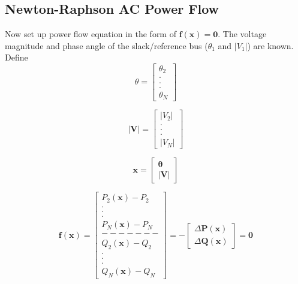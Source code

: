 \documentclass[12pt]{article}
\begin{document}
\subsection*{Newton-Raphson AC Power Flow}

Now set up power flow equation in the form of $\mathbf{f}\left (\mathbf{x} \right )=\mathbf{0}$.
The voltage magnitude and phase angle of the slack/reference bus ($\theta_{1}$
and $|V_{1}|$) are known.
\space
\space
Define
\begin{equation}
\theta =\left [ \begin{array}{c} \theta{_2}\\.\\.\\.\\ \theta_{N} \end{array} \right]
\end{equation}

\begin{equation}
|\mathbf{V}| =\left [ \begin{array}{c} |V_{2}| \\.\\.\\.\\|V_{N}| \end{array} \right]
\end{equation}

\begin{equation}
\mathbf{x}  =\left [ \begin{array}{c} \boldsymbol{\theta}\\|\mathbf{V}| \end{array} \right]
\end{equation}


\begin{equation}
\mathbf{f}\left (\mathbf{x} \right ) = \left [ \begin{array}{c} P_{2}\left (
\mathbf{x} \right ) - P_{2} \\.\\.\\.\\ P_{N}\left ( \mathbf{x} \right ) - P_{N}
\\-------\\Q_{2}\left ( \mathbf{x} \right ) - Q_{2} \\.\\.\\.\\ Q_{N}\left (
\mathbf{x} \right ) - Q_{N} \end{array} \right ] =- \left [ \begin{array}{c} \Delta \mathbf{P}\left ( \mathbf{x} \right ) \\ \Delta \mathbf{Q}\left ( \mathbf{x} \right ) \end{array} \right ] = \mathbf{0}
\end{equation}
\end{document}
